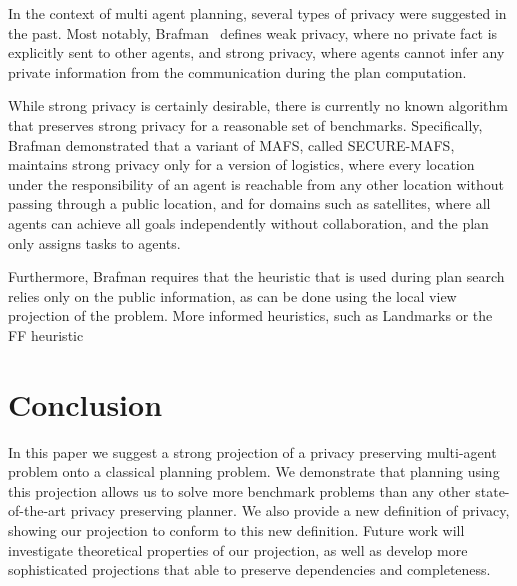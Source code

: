 \documentclass[letterpaper]{article}
\theoremstyle{definition}
\begin{document}


In the context of multi agent planning, several types of privacy were suggested in the past. Most notably, Brafman~\cite{Brafman15} defines weak privacy, where no private fact is explicitly sent to other agents, and strong privacy, where agents cannot infer any private information from the communication during the plan computation.

While strong privacy is certainly desirable, there is currently no known algorithm that preserves strong privacy for a reasonable set of benchmarks. Specifically, Brafman demonstrated that a variant of MAFS, called SECURE-MAFS, maintains strong privacy only for a version of logistics, where every location under the responsibility of an agent is reachable from any other location without passing through a public location, and for domains such as satellites, where all agents can achieve all goals independently without collaboration, and the plan only assigns tasks to agents.

Furthermore, Brafman requires that the heuristic that is used during plan search relies only on the public information, as can be done using the local view projection of the problem. More informed heuristics, such as Landmarks\cite{maliah2014privacyPreserving,vstolba2014relaxation} or the FF heuristic \cite{vstolba2015admissible}



\section{Conclusion}
In this paper we suggest a strong projection of a privacy preserving multi-agent problem onto a classical planning problem. We demonstrate that planning using this projection allows us to solve more benchmark problems than any other state-of-the-art privacy preserving planner. We also provide a new definition of privacy, showing our projection to conform to this new definition. Future work will investigate theoretical properties of our projection, as well as develop more sophisticated projections that able to preserve dependencies and completeness.
\end{document}

